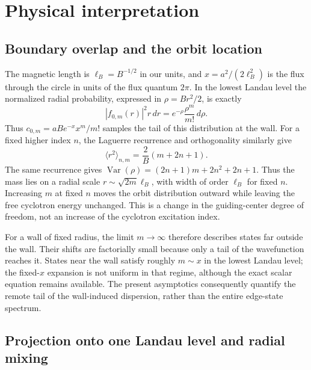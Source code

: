\documentclass[12pt,a4paper]{article}
\numberwithin{equation}{section}
\theoremstyle{remark}
\theoremstyle{definition}
\begin{document}
\section{Physical interpretation}\label{sec:discussion}

\subsection{Boundary overlap and the orbit location}

The magnetic length is $\ell_B=B^{-1/2}$ in our units, and
$x=a^2/(2\ell_B^2)$ is the flux through the circle in units of the flux
quantum $2\pi$. In the lowest Landau level the normalized radial
probability, expressed in $\rho=Br^2/2$, is exactly
\begin{equation}\label{eq:gamma-probability}
|f_{0,m}(r)|^2r\,dr
=e^{-\rho}\frac{\rho^m}{m!}\,d\rho.
\end{equation}
Thus $c_{0,m}=aB e^{-x}x^m/m!$ samples the tail of this distribution
at the wall. For a fixed higher index $n$, the Laguerre recurrence and
orthogonality similarly give
\begin{equation}\label{eq:mean-radius}
\langle r^2\rangle_{n,m}=\frac{2}{B}(m+2n+1).
\end{equation}
The same recurrence gives
$\operatorname{Var}(\rho)=(2n+1)m+2n^2+2n+1$.
Thus the mass lies on a radial scale $r\sim\sqrt{2m}\ell_B$, with width
of order $\ell_B$ for fixed $n$. Increasing $m$ at fixed $n$ moves the
orbit distribution outward while leaving the free cyclotron energy
unchanged. This is a change in the guiding-center degree of freedom,
not an increase of the cyclotron excitation index.

For a wall of fixed radius, the limit $m\to\infty$ therefore describes
states far outside the wall. Their shifts are factorially small because
only a tail of the wavefunction reaches it. States near the wall satisfy
roughly $m\sim x$ in the lowest Landau level; the fixed-$x$ expansion is
not uniform in that regime, although the exact scalar equation remains
available. The present asymptotics consequently quantify the remote tail
of the wall-induced dispersion, rather than the entire edge-state spectrum.

\subsection{Projection onto one Landau level and radial mixing}
\end{document}
